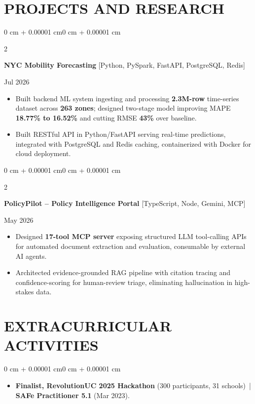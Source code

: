 \documentclass[10pt, letterpaper]{article}
\newenvironment{highlights}{
    \begin{itemize}[
        topsep=0.10 cm,
        parsep=0.06 cm,
        partopsep=0pt,
        itemsep=0.06 cm,
        leftmargin=12pt
    ]
}{
    \end{itemize}
}
\newenvironment{onecolentry}{
    \begin{adjustwidth}{0 cm + 0.00001 cm}{0 cm + 0.00001 cm}
}{
    \end{adjustwidth}
}
\newenvironment{twocolentry}[2][]{
    \onecolentry
    \def\secondColumn{#2}
    \setcolumnwidth{\fill, 4.5 cm}
    \begin{paracol}{2}
}{
    \switchcolumn \raggedleft \secondColumn
    \end{paracol}
    \endonecolentry
}
\begin{document}
\section{PROJECTS AND RESEARCH}
\begin{twocolentry}{Jul 2026}
\textbf{NYC Mobility Forecasting} [Python, PySpark, FastAPI, PostgreSQL, Redis]
\end{twocolentry}
\begin{highlights}
  \item Built backend ML system ingesting and processing \textbf{2.3M-row} time-series dataset across \textbf{263 zones}; designed two-stage model improving MAPE \textbf{18.77\% to 16.52\%} and cutting RMSE \textbf{43\%} over baseline.
  \item Built RESTful API in Python/FastAPI serving real-time predictions, integrated with PostgreSQL and Redis caching, containerized with Docker for cloud deployment.
\end{highlights}

\vspace{0.12 cm}

\begin{twocolentry}{May 2026}
\textbf{PolicyPilot -- Policy Intelligence Portal} [TypeScript, Node, Gemini, MCP]
\end{twocolentry}
\begin{highlights}
  \item Designed \textbf{17-tool MCP server} exposing structured LLM tool-calling APIs for automated document extraction and evaluation, consumable by external AI agents.
  \item Architected evidence-grounded RAG pipeline with citation tracing and confidence-scoring for human-review triage, eliminating hallucination in high-stakes data.
\end{highlights}

\section{EXTRACURRICULAR ACTIVITIES}
\begin{onecolentry}
\begin{highlights}
  \item \textbf{Finalist, RevolutionUC 2025 Hackathon} (300 participants, 31 schools) \,|\, \textbf{SAFe Practitioner 5.1} (Mar 2023).
\end{highlights}
\end{onecolentry}
\end{document}
